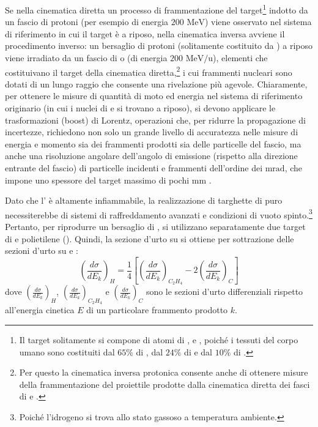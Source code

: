 \documentclass[12pt,a4paper,twoside]{report}
\begin{document}
	Se nella cinematica diretta un processo di frammentazione del target\footnote{Il target solitamente si compone di atomi di ,  e , poiché i tessuti del corpo umano sono costituiti dal $65\%$ di , dal $24\%$ di  e dal $10\%$ di .} indotto da un fascio di protoni (per esempio di energia $200\mbox{ MeV}$) viene osservato nel sistema di riferimento in cui il target è a riposo, nella cinematica inversa avviene il procedimento inverso: un bersaglio di protoni (solitamente costituito da ) a riposo viene irradiato da un fascio di  o  (di energia $200\mbox{ MeV/u}$), elementi che costituivano il target della cinematica diretta,\footnote{Per questo la cinematica inversa protonica consente anche di ottenere misure della frammentazione del proiettile prodotte dalla cinematica diretta dei fasci di  e .} i cui frammenti nucleari sono dotati di un lungo raggio che consente una rivelazione più agevole. Chiaramente, per ottenere le misure di quantità di moto ed energia nel sistema di riferimento originario (in cui i nuclei di  e  si trovano a riposo), si devono applicare le trasformazioni (boost) di Lorentz, operazioni che, per ridurre la propagazione di incertezze, richiedono non solo un grande livello di accuratezza nelle misure di energia e momento sia dei frammenti prodotti sia delle particelle del fascio, ma anche una risoluzione angolare dell'angolo di emissione (rispetto alla direzione entrante del fascio) di particelle incidenti e frammenti dell'ordine dei $\mbox{mrad}$, che impone uno spessore del target massimo di pochi $\mbox{mm}$ \cite{foot_cdr}.
	
	Dato che l' è altamente infiammabile, la realizzazione di targhette di  puro necessiterebbe di sistemi di raffreddamento avanzati e condizioni di vuoto spinto.\footnote{Poiché l'idrogeno si trova allo stato gassoso a temperatura ambiente.} Pertanto, per riprodurre un bersaglio di , si utilizzano separatamente due target di  e polietilene (). Quindi, la sezione d'urto su  si ottiene per sottrazione delle sezioni d'urto su  e :
	\begin{equation}
		\left(\frac{d\sigma}{dE_k}\right)_{H}=\frac{1}{4}\left[\left(\frac{d\sigma}{dE_k}\right)_{{C_2H_4}}-2\left(\frac{d\sigma}{dE_k}\right)_{{C}}\right]
		\label{eq:c2h4}
	\end{equation}
	dove $\left(\frac{d\sigma}{dE_k}\right)_{H}$, $\left(\frac{d\sigma}{dE_k}\right)_{{C_2H_4}}$ e $\left(\frac{d\sigma}{dE_k}\right)_{{C}}$ sono le sezioni d'urto differenziali rispetto all'energia cinetica $E$ di un particolare frammento prodotto $k$.
		
\end{document}
